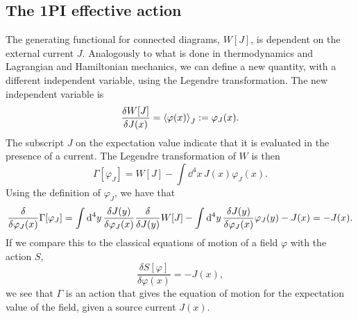 \subsection{The 1PI effective action}
\label{section: effective action}
The generating functional for connected diagrams, $W[J]$, is dependent on the external current $J$.
Analogously to what is done in thermodynamics and Lagrangian and Hamiltonian mechanics, we can define a new quantity, with a different independent variable, using the Legendre transformation.
The new independent variable is 
\begin{equation}
    \frac{\delta W[J]}{\delta J(x)} = \ex{\varphi(x)}_J := \varphi_J(x).
\end{equation}
The subscript $J$ on the expectation value indicate that it is evaluated in the presence of a current.
The Legendre transformation of $W$ is then
\begin{equation}
    \Gamma[\varphi_J]
    = W[J] - \int \dd^4 x \, J(x) \varphi_J(x).
\end{equation}
Using the definition of $\varphi_J$, we have that
\begin{equation}
    \label{effective equation of motion}
    \fdv{\varphi_J(x)} \Gamma[\varphi_J]
    = \int \dd^4 y \, \fdv{J(y)}{\varphi_J(x)} \fdv{J(y)} W[J]
    - \int \dd^4 y \, \fdv{J(y)}{\varphi_J(x)} \varphi_J(y)
    - J(x)
    = - J(x).
\end{equation}
If we compare this to the classical equations of motion of a field $\varphi$ with the action $S$,
\begin{equation}
    \frac{\delta S[\varphi]}{\delta \varphi(x)} = -J(x),
\end{equation}
we see that $\Gamma$ is an action that gives the equation of motion for the expectation value of the field, given a source current $J(x)$.

